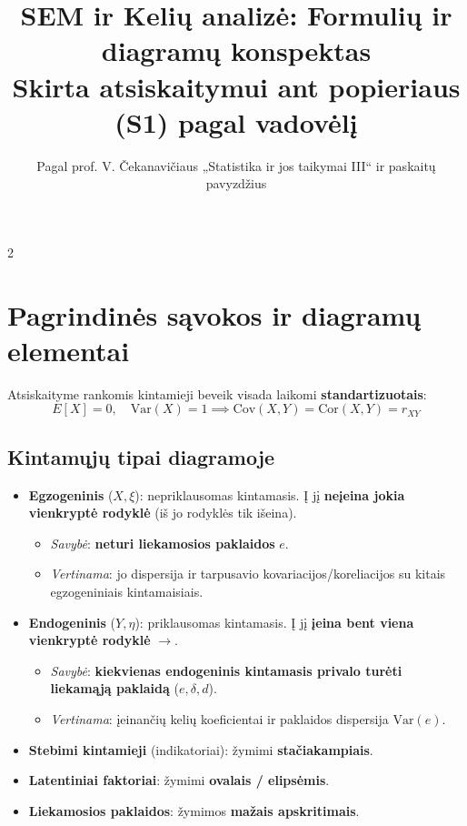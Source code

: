 \documentclass[9pt,a4paper]{article}
\title{\vspace{-1.2cm}\Large\textbf{SEM ir Kelių analizė: Formulių ir diagramų konspektas}\\\large Skirta atsiskaitymui ant popieriaus (S1) pagal vadovėlį\vspace{-0.5cm}}
\author{Pagal prof. V. Čekanavičiaus „Statistika ir jos taikymai III“ ir paskaitų pavyzdžius}
\date{}
\begin{document}
\maketitle
\thispagestyle{fancy}

\begin{multicols*}{2}

\section{Pagrindinės sąvokos ir diagramų elementai}
Atsiskaityme rankomis kintamieji beveik visada laikomi \textbf{standartizuotais}:
\begin{equation*}
    E[X] = 0, \quad \text{Var}(X) = 1 \implies \text{Cov}(X, Y) = \text{Cor}(X, Y) = r_{XY}
\end{equation*}

\subsection{Kintamųjų tipai diagramoje}
\begin{itemize}
    \item \textbf{Egzogeninis} ($X, \xi$): nepriklausomas kintamasis. Į jį \textbf{neįeina jokia vienkryptė rodyklė} (iš jo rodyklės tik išeina).
    \begin{itemize}
        \item \textit{Savybė}: \textbf{neturi liekamosios paklaidos} $e$.
        \item \textit{Vertinama}: jo dispersija ir tarpusavio kovariacijos/koreliacijos su kitais egzogeniniais kintamaisiais.
    \end{itemize}
    \item \textbf{Endogeninis} ($Y, \eta$): priklausomas kintamasis. Į jį \textbf{įeina bent viena vienkryptė rodyklė} $\to$.
    \begin{itemize}
        \item \textit{Savybė}: \textbf{kiekvienas endogeninis kintamasis privalo turėti liekamąją paklaidą} ($e, \delta, d$).
        \item \textit{Vertinama}: įeinančių kelių koeficientai ir paklaidos dispersija $\text{Var}(e)$.
    \end{itemize}
    \item \textbf{Stebimi kintamieji} (indikatoriai): žymimi \textbf{stačiakampiais}.
    \item \textbf{Latentiniai faktoriai}: žymimi \textbf{ovalais / elipsėmis}.
    \item \textbf{Liekamosios paklaidos}: žymimos \textbf{mažais apskritimais}.
\end{itemize}


\end{multicols*}
\end{document}
